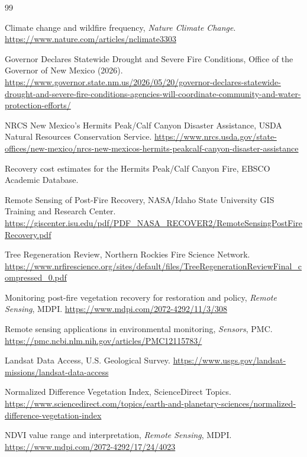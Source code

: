\documentclass[11pt]{article}
\begin{document}
\begin{thebibliography}{99}

Climate change and wildfire frequency, \textit{Nature Climate Change}. \url{https://www.nature.com/articles/nclimate3303}

Governor Declares Statewide Drought and Severe Fire Conditions, Office of the Governor of New Mexico (2026). \url{https://www.governor.state.nm.us/2026/05/20/governor-declares-statewide-drought-and-severe-fire-conditions-agencies-will-coordinate-community-and-water-protection-efforts/}

NRCS New Mexico's Hermits Peak/Calf Canyon Disaster Assistance, USDA Natural Resources Conservation Service. \url{https://www.nrcs.usda.gov/state-offices/new-mexico/nrcs-new-mexicos-hermits-peakcalf-canyon-disaster-assistance}

Recovery cost estimates for the Hermits Peak/Calf Canyon Fire, EBSCO Academic Database.

Remote Sensing of Post-Fire Recovery, NASA/Idaho State University GIS Training and Research Center. \url{https://giscenter.isu.edu/pdf/PDF_NASA_RECOVER2/RemoteSensingPostFireRecovery.pdf}

Tree Regeneration Review, Northern Rockies Fire Science Network. \url{https://www.nrfirescience.org/sites/default/files/TreeRegenerationReviewFinal_compressed_0.pdf}

Monitoring post-fire vegetation recovery for restoration and policy, \textit{Remote Sensing}, MDPI. \url{https://www.mdpi.com/2072-4292/11/3/308}

Remote sensing applications in environmental monitoring, \textit{Sensors}, PMC. \url{https://pmc.ncbi.nlm.nih.gov/articles/PMC12115783/}

Landsat Data Access, U.S. Geological Survey. \url{https://www.usgs.gov/landsat-missions/landsat-data-access}

Normalized Difference Vegetation Index, ScienceDirect Topics. \url{https://www.sciencedirect.com/topics/earth-and-planetary-sciences/normalized-difference-vegetation-index}

NDVI value range and interpretation, \textit{Remote Sensing}, MDPI. \url{https://www.mdpi.com/2072-4292/17/24/4023}


\end{thebibliography}
\end{document}
